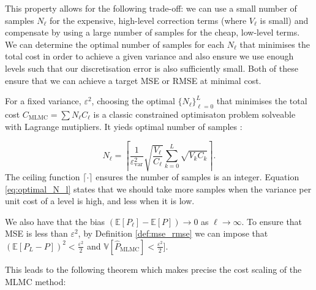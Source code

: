 This property allows for the following trade-off: we can use a small number 
of samples $N_\ell$ 
for the expensive, high-level correction terms (where $V_\ell$ is small) 
and compensate 
by using a large number of samples for the cheap, low-level terms. We can 
determine the 
optimal number of samples for each $N_\ell$ that minimises the total cost in
order 
to achieve a given variance and also ensure we use enough levels such that our
discretisation error 
is also sufficiently small. Both of these ensure that we can achieve a target
MSE or RMSE at minimal cost.

For a fixed variance, $\varepsilon^2$, choosing the optimal $\{N_\ell\}_{\ell=0}^L$ that 
minimises the total cost $C_{\textrm{MLMC}} = \sum N_\ell C_\ell$ is a classic 
constrained optimisaton problem solveable with Lagrange mutipliers. It yieds 
optimal number of samples \cite{giles2015multilevel}:

\begin{equation}\label{eq:optimal_N_l}
    N_\ell = \left\lceil \frac{1}{\varepsilon_{\text{var}}^2} \sqrt{\frac{V_\ell}{C_\ell}} \sum_{k=0}^L \sqrt{V_k C_k} \right\rceil.
\end{equation}
The ceiling function $\lceil \cdot \rceil$ ensures the number of samples is an integer.
Equation \eqref{eq:optimal_N_l} states that we should take more samples when the 
variance per unit cost of a level is high, and less when it is low.


We also have that the bias $(\mathbb{E}[P_\ell] - \mathbb{E}[P]) \to 0$ as $\ell \to \infty$. 
To ensure that MSE is less than $\varepsilon^2$, by Definition \ref{def:mse_rmse} we can 
impose that 
$(\mathbb{E}[P_L  - P])^2 < \frac{\varepsilon^2}{2}$ and 
$\mathbb{V}[\hat{P}_{\mathrm{MLMC}}] < \frac{\varepsilon^2}{2}]$. 

This leads to the following theorem \cite{giles2015multilevel} which makes 
precise the cost scaling of the MLMC method:

